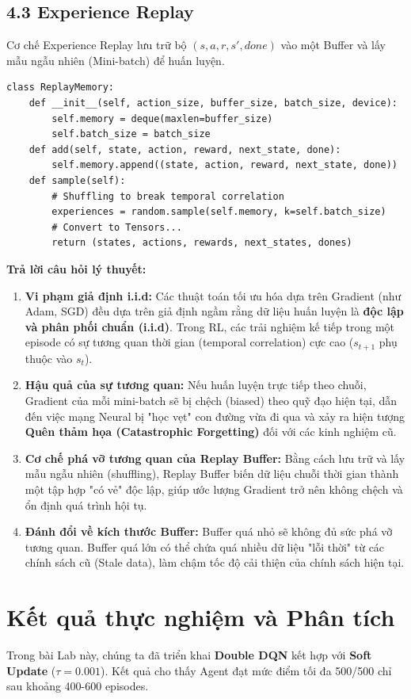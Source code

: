 \subsection{4.3 Experience Replay}
Cơ chế Experience Replay lưu trữ bộ $(s, a, r, s', done)$ vào một Buffer và lấy mẫu ngẫu nhiên (Mini-batch) để huấn luyện.

\begin{lstlisting}[style=PythonStyle, caption={Experience Replay Implementation}]
class ReplayMemory:
    def __init__(self, action_size, buffer_size, batch_size, device):
        self.memory = deque(maxlen=buffer_size)
        self.batch_size = batch_size
    def add(self, state, action, reward, next_state, done):
        self.memory.append((state, action, reward, next_state, done))
    def sample(self):
        # Shuffling to break temporal correlation
        experiences = random.sample(self.memory, k=self.batch_size)
        # Convert to Tensors...
        return (states, actions, rewards, next_states, dones)
\end{lstlisting}
\textbf{Trả lời câu hỏi lý thuyết:}
\begin{enumerate}
    \item \textbf{Vi phạm giả định i.i.d:} Các thuật toán tối ưu hóa dựa trên Gradient (như Adam, SGD) đều dựa trên giả định ngầm rằng dữ liệu huấn luyện là \textbf{độc lập và phân phối chuẩn (i.i.d)}. Trong RL, các trải nghiệm kế tiếp trong một episode có sự tương quan thời gian (temporal correlation) cực cao ($s_{t+1}$ phụ thuộc vào $s_t$).
    \item \textbf{Hậu quả của sự tương quan:} Nếu huấn luyện trực tiếp theo chuỗi, Gradient của mỗi mini-batch sẽ bị chệch (biased) theo quỹ đạo hiện tại, dẫn đến việc mạng Neural bị "học vẹt" con đường vừa đi qua và xảy ra hiện tượng \textbf{Quên thảm họa (Catastrophic Forgetting)} đối với các kinh nghiệm cũ.
    \item \textbf{Cơ chế phá vỡ tương quan của Replay Buffer:} Bằng cách lưu trữ và lấy mẫu ngẫu nhiên (shuffling), Replay Buffer biến dữ liệu chuỗi thời gian thành một tập hợp "có vẻ" độc lập, giúp ước lượng Gradient trở nên không chệch và ổn định quá trình hội tụ.
    \item \textbf{Đánh đổi về kích thước Buffer:} Buffer quá nhỏ sẽ không đủ sức phá vỡ tương quan. Buffer quá lớn có thể chứa quá nhiều dữ liệu "lỗi thời" từ các chính sách cũ (Stale data), làm chậm tốc độ cải thiện của chính sách hiện tại.
\end{enumerate}

\section{Kết quả thực nghiệm và Phân tích}
Trong bài Lab này, chúng ta đã triển khai \textbf{Double DQN} kết hợp với \textbf{Soft Update} ($\tau = 0.001$). Kết quả cho thấy Agent đạt mức điểm tối đa 500/500 chỉ sau khoảng 400-600 episodes.

